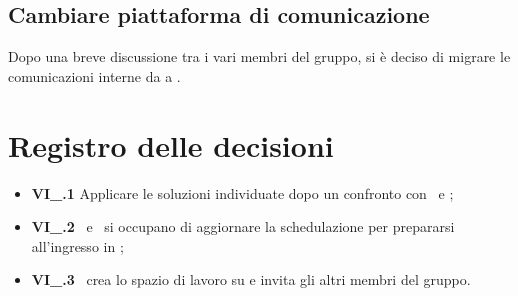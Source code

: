 \subsection{Cambiare piattaforma di comunicazione}
Dopo una breve discussione tra i vari membri del gruppo, si è deciso di migrare le comunicazioni interne da  a .

\section{Registro delle decisioni}
\begin{itemize}
  \item \textbf{VI\_\Data.1} Applicare le soluzioni individuate dopo un confronto con \VT\ e \CR;
  \item \textbf{VI\_\Data.2} \MM\ e \TL\ si occupano di aggiornare la schedulazione per prepararsi all'ingresso in ;
  \item \textbf{VI\_\Data.3} \FF\ crea lo spazio di lavoro su  e invita gli altri membri del gruppo.
\end{itemize}